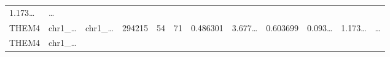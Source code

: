 \documentclass[
]{article}
\begin{document}
\begin{longtable}[]{@{}llllllllllll@{}}
\begin{minipage}[t]{0.09\columnwidth}
1.173\ldots{}\strut
\end{minipage} & \begin{minipage}[t]{0.02\columnwidth}\raggedright
\ldots{}\strut
\end{minipage}\tabularnewline
\begin{minipage}[t]{0.06\columnwidth}\raggedright
THEM4\strut
\end{minipage} & \begin{minipage}[t]{0.06\columnwidth}\raggedright
chr1\_\ldots{}\strut
\end{minipage} & \begin{minipage}[t]{0.06\columnwidth}\raggedright
chr1\_\ldots{}\strut
\end{minipage} & \begin{minipage}[t]{0.06\columnwidth}\raggedright
294215\strut
\end{minipage} & \begin{minipage}[t]{0.06\columnwidth}\raggedright
54\strut
\end{minipage} & \begin{minipage}[t]{0.06\columnwidth}\raggedright
71\strut
\end{minipage} & \begin{minipage}[t]{0.06\columnwidth}\raggedright
0.486301\strut
\end{minipage} & \begin{minipage}[t]{0.08\columnwidth}\raggedright
3.677\ldots{}\strut
\end{minipage} & \begin{minipage}[t]{0.06\columnwidth}\raggedright
0.603699\strut
\end{minipage} & \begin{minipage}[t]{0.06\columnwidth}\raggedright
0.093\ldots{}\strut
\end{minipage} & \begin{minipage}[t]{0.09\columnwidth}\raggedright
1.173\ldots{}\strut
\end{minipage} & \begin{minipage}[t]{0.02\columnwidth}\raggedright
\ldots{}\strut
\end{minipage}\tabularnewline
\begin{minipage}[t]{0.06\columnwidth}\raggedright
THEM4\strut
\end{minipage} & \begin{minipage}[t]{0.06\columnwidth}\raggedright
chr1\_\ldots{}\strut
\end{minipage} & \begin{minipage}[t]{0.06\columnwidth}\raggedright

\end{minipage}
\end{longtable}
\end{document}
